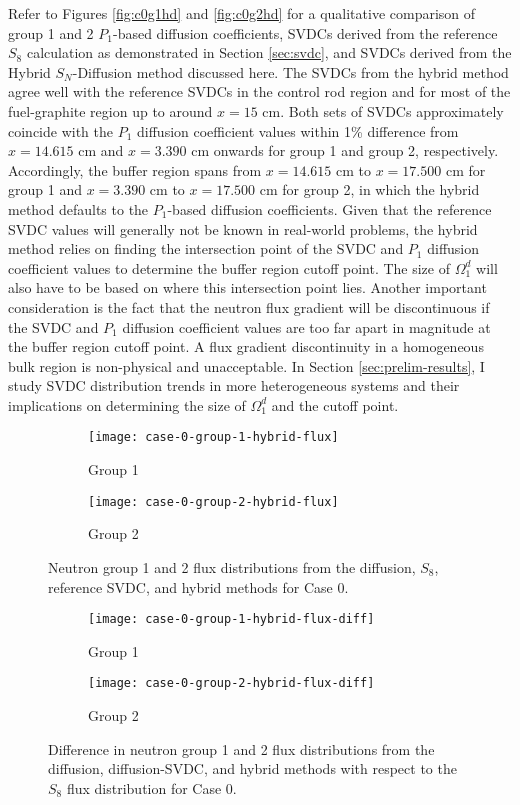 Refer to Figures \ref{fig:c0g1hd} and \ref{fig:c0g2hd} for a qualitative comparison of group 1 and
2 $P_1$-based diffusion coefficients, \glspl{SVDC} derived from the reference $S_8$ calculation as
demonstrated in Section \ref{sec:svdc}, and \glspl{SVDC} derived from the Hybrid $S_N$-Diffusion
method discussed here. The \glspl{SVDC} from the hybrid method agree well with the reference
\glspl{SVDC} in the control rod region and for most of the fuel-graphite region up to around
$x=15$ cm. Both sets of \glspl{SVDC} approximately coincide with the $P_1$ diffusion coefficient
values within 1\% difference from $x=14.615$ cm and $x=3.390$ cm onwards for group 1 and
group 2, respectively. Accordingly, the buffer region spans from $x=14.615$ cm to $x=17.500$ cm for
group 1 and $x=3.390$ cm to $x=17.500$ cm for group 2, in which the hybrid method defaults to the
$P_1$-based diffusion coefficients. Given that the reference \gls{SVDC} values will generally not
be known in real-world problems, the hybrid method relies on finding the intersection point of the
\gls{SVDC} and $P_1$ diffusion coefficient values to determine the buffer region cutoff point. The
size of $\Omega^d_1$ will also have to be based on where this intersection point lies.
Another important consideration is the fact that the neutron flux gradient will be discontinuous if
the \gls{SVDC} and $P_1$ diffusion coefficient values are too far apart in magnitude at the buffer
region cutoff point. A flux gradient discontinuity in a homogeneous bulk region is non-physical and
unacceptable. In Section \ref{sec:prelim-results}, I study \gls{SVDC} distribution trends
in more heterogeneous systems and their implications on determining the size of $\Omega^d_1$ and
the cutoff point.
%
\begin{figure}[htb!]
  \centering
  \begin{subfigure}[b]{.49\textwidth}
    \centering
    \texttt{[image: case-0-group-1-hybrid-flux]}
    \caption{Group 1}
    \label{fig:c0g1hf}
  \end{subfigure}
  \hfill
  \begin{subfigure}[b]{.49\textwidth}
    \centering
    \texttt{[image: case-0-group-2-hybrid-flux]}
    \caption{Group 2}
    \label{fig:c0g2hf}
  \end{subfigure}
  \caption{Neutron group 1 and 2 flux distributions from the diffusion, $S_8$, reference
  \gls{SVDC}, and hybrid methods for Case 0.}
  \label{fig:c0hf}
  \centering
  \begin{subfigure}[b]{.49\textwidth}
    \centering
    \texttt{[image: case-0-group-1-hybrid-flux-diff]}
    \caption{Group 1}
    \label{fig:c0g1hfdiff}
  \end{subfigure}
  \hfill
  \begin{subfigure}[b]{.49\textwidth}
    \centering
    \texttt{[image: case-0-group-2-hybrid-flux-diff]}
    \caption{Group 2}
    \label{fig:c0g2hfdiff}
  \end{subfigure}
  \caption{Difference in neutron group 1 and 2 flux distributions from the diffusion,
  diffusion-\gls{SVDC}, and hybrid methods with respect to the $S_8$ flux distribution for Case 0.}
  \label{fig:c0hfdiff}
\end{figure}

